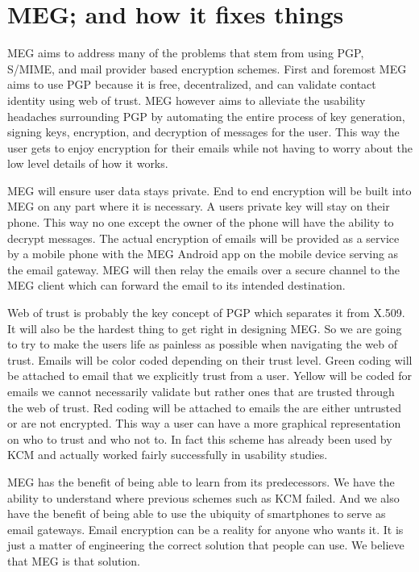\documentclass{article}
\begin{document}
\section{MEG; and how it fixes things}
\par MEG aims to address many of the problems that stem from using PGP, S/MIME, and mail provider based encryption schemes. First and foremost MEG aims to use PGP because it is free, decentralized, and can validate contact identity using web of trust. MEG however aims to alleviate the usability headaches surrounding PGP by automating the entire process of key generation, signing keys, encryption, and decryption of messages for the user. This way the user gets to enjoy encryption for their emails while not having to worry about the low level details of how it works.
\par MEG will ensure user data stays private. End to end encryption will be built into MEG on any part where it is necessary. A users private key will stay on their phone. This way no one except the owner of the phone will have the ability to decrypt messages. The actual encryption of emails will be provided as a service by a mobile phone with the MEG Android app on the mobile device serving as the email gateway. MEG will then relay the emails over a secure channel to the MEG client which can forward the email to its intended destination.
\par Web of trust is probably the key concept of PGP which separates it from X.509. It will also be the hardest thing to get right in designing MEG. So we are going to try to make the users life as painless as possible when navigating the web of trust. Emails will be color coded depending on their trust level. Green coding will be attached to email that we explicitly trust from a user. Yellow will be coded for emails we cannot necessarily validate but rather ones that are trusted through the web of trust. Red coding will be attached to emails the are either untrusted or are not encrypted. This way a user can have a more graphical representation on who to trust and who not to. In fact this scheme has already been used by KCM and actually worked fairly successfully in usability studies\cite{garfinkel2005johnny}.
\par MEG has the benefit of being able to learn from its predecessors. We have the ability to understand where previous schemes such as KCM failed. And we also have the benefit of being able to use the ubiquity of smartphones to serve as email gateways. Email encryption can be a reality for anyone who wants it. It is just a matter of engineering the correct solution that people can use. We believe that MEG is that solution.


\end{document}
